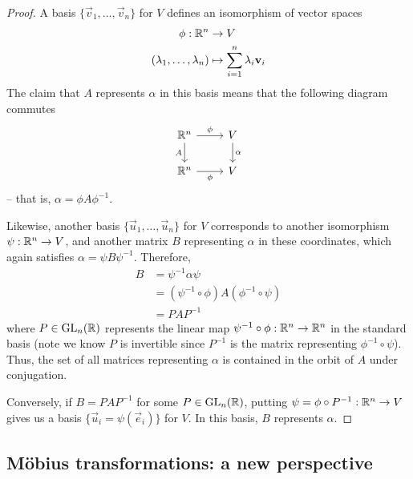 \documentclass{../../template/note}
\begin{document}
    \begin{proof}
        A basis \(\{\vec v_1, \dots, \vec v_n\}\) for \(V\) defines an isomorphism of vector spaces
        \begin{align*}
            \phi: \RR^n &\to V \\
            (\lambda_1, \dots, \lambda_n) &\mapsto \sum_{i=1}^n \lambda_i \vec v_i
        \end{align*}
        The claim that \(A\) represents \(\alpha\) in this basis means that the following diagram commutes
        \[\begin{tikzcd}
            {\RR^n} & V \\
            {\RR^n} & V
            \arrow["\phi", from=1-1, to=1-2]
            \arrow["A"', from=1-1, to=2-1]
            \arrow["\alpha", from=1-2, to=2-2]
            \arrow["\phi"', from=2-1, to=2-2]
        \end{tikzcd}\]
        -- that is, \(\alpha = \phi A \phi^{-1}\).
        

        Likewise, another basis \(\{\vec u_1, \dots, \vec u_n\}\) for \(V\) corresponds to another isomorphism \(\psi: \mathbb R^n \to V\), and another matrix \(B\) representing \(\alpha\) in these coordinates, which again satisfies \(\alpha = \psi B \psi^{-1}\). Therefore,
        \begin{align*}
            B &= \psi^{-1}\alpha \psi \\
            &= (\psi^{-1} \circ \phi) A(\phi^{-1} \circ \psi) \\
            &= PAP^{-1}
        \end{align*}
        where \(P \in \operatorname{GL}_n(\mathbb R)\) represents the linear map \(\psi^{-1} \circ \phi: \mathbb R^n \to \mathbb R^n\) in the standard basis (note we know \(P\) is invertible since \(P^{-1}\) is the matrix representing \(\phi^{-1} \circ \psi\)). Thus, the set of all matrices representing \(\alpha\) is contained in the orbit of \(A\) under conjugation.

        Conversely, if \(B = PAP^{-1}\) for some \(P \in \operatorname{GL}_n(\mathbb R)\), putting \(\psi = \phi \circ P^{-1}: \mathbb R^n \to V\) gives us a basis \(\{\vec u_i = \psi(\vec e_i)\}\) for \(V\). In this basis, \(B\) represents \(\alpha\).
    \end{proof}

    \subsection{M\"obius transformations: a new perspective}
\end{document}
